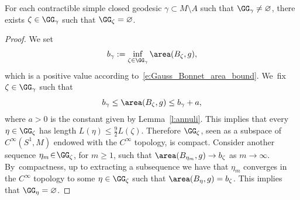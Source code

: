 \begin{Lemma}\label{l:innermost}
For each contractible simple closed geodesic $\gamma\subset M\setminus A$ such that $\GG_\gamma\neq\varnothing$, there exists $\zeta\in\GG_\gamma$ such that $\GG_\zeta=\varnothing$.
\end{Lemma}

\begin{proof}
We set
\begin{align*}
b_\gamma:=\inf_{\zeta\in\GG_\gamma} \area(B_\zeta,g),
\end{align*}
which is a positive value according to~\eqref{e:Gauss_Bonnet_area_bound}. We~fix $\zeta\in\GG_\gamma$ such that
\[
b_\gamma \leq\area(B_{\zeta},g)\leq b_\gamma +a,
\]
where $a>0$ is the constant given by Lemma~\ref{l:annuli}. This implies that every $\eta\in\GG_{\zeta}$ has length $L(\eta)\leq\tfrac92 L(\zeta)$. Therefore $\GG_{\zeta}$, seen as a subspace of $C^\infty(S^1,M)$ endowed with the $C^\infty$ topology, is compact. Consider another sequence $\eta_m\!\in\!\GG_{\zeta}$, for $m\!\geq\!1$, such that $\area(B_{\eta_m},g)\to b_{\zeta}$ as $m\to\infty$. By~compactness, up to extracting a subsequence we have that $\eta_m$ converges in the $C^\infty$ topology to some $\eta\in\GG_{\zeta}$ such that $\area(B_\eta,g)=\nobreak b_{\zeta}$. This implies that $\GG_\eta=\varnothing$.
\end{proof}


